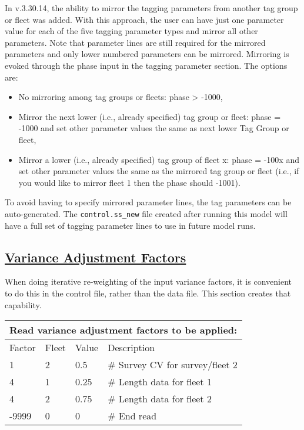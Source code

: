In v.3.30.14, the ability to mirror the tagging parameters from another tag group or fleet was added. With this approach, the user can have just one parameter value for each of the five tagging parameter types and mirror all other parameters. Note that parameter lines are still required for the mirrored parameters and only lower numbered parameters can be mirrored. Mirroring is evoked through the phase input in the tagging parameter section. The options are:
\begin{itemize}
	\item No mirroring among tag groups or fleets: phase > -1000,
	\item Mirror the next lower (i.e., already specified) tag group or fleet: phase = -1000 and set other parameter values the same as next lower Tag Group or fleet,
	\item Mirror a lower (i.e., already specified) tag group of fleet x: phase = -100x and set other parameter values the same as the mirrored tag group or fleet (i.e., if you would like to mirror fleet 1 then the phase should -1001).
\end{itemize}

To avoid having to specify mirrored parameter lines, the tag parameters can be auto-generated. The \texttt{control.ss\_new} file created after running this model will have a full set of tagging parameter lines to use in future model runs.

\hypertarget{GcompVar}{}
\subsection[Variance Adjustment Factors]{\protect\hyperlink{GcompVar}{Variance Adjustment Factors}}
When doing iterative re-weighting of the input variance factors, it is convenient to do this in the control file, rather than the data file. This section creates that capability.

\begin{longtable}{p{3cm} p{3cm} p{2.5cm} p{6.25cm}}

	\multicolumn{4}{l}{Read variance adjustment factors to be applied:} \\
	\hline
	Factor & Fleet & Value & Description \Tstrut\Bstrut\\
	\hline
	1 & 2 & 0.5 & \# Survey CV for survey/fleet 2 \Tstrut\\
	4 & 1 & 0.25 & \# Length data for fleet 1 \\
	4 & 2 & 0.75 & \# Length data for fleet 2 \\
	-9999 & 0 & 0 & \# End read \Bstrut\\
	\hline
\end{longtable}


